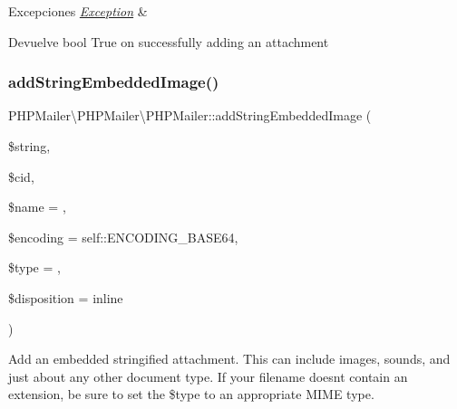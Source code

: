 \begin{DoxyExceptions}{Excepciones}
{\em \hyperlink{classPHPMailer_1_1PHPMailer_1_1Exception}{Exception}} & \\
\hline
\end{DoxyExceptions}
\begin{DoxyReturn}{Devuelve}
bool True on successfully adding an attachment 
\end{DoxyReturn}
\mbox{\label{classPHPMailer_1_1PHPMailer_1_1PHPMailer_aa329b7b65a55a32acdfceae30c1707a8}} 
\subsubsection{\texorpdfstring{add\+String\+Embedded\+Image()}{addStringEmbeddedImage()}}
{\footnotesize\ttfamily P\+H\+P\+Mailer\textbackslash{}\+P\+H\+P\+Mailer\textbackslash{}\+P\+H\+P\+Mailer\+::add\+String\+Embedded\+Image (\begin{DoxyParamCaption}\item[{}]{\$string,  }\item[{}]{\$cid,  }\item[{}]{\$name = {\ttfamily \textquotesingle{}\textquotesingle{}},  }\item[{}]{\$encoding = {\ttfamily self\+:\+:ENCODING\+\_\+BASE64},  }\item[{}]{\$type = {\ttfamily \textquotesingle{}\textquotesingle{}},  }\item[{}]{\$disposition = {\ttfamily \textquotesingle{}inline\textquotesingle{}} }\end{DoxyParamCaption})}

Add an embedded stringified attachment. This can include images, sounds, and just about any other document type. If your filename doesn\textquotesingle{}t contain an extension, be sure to set the \$type to an appropriate M\+I\+ME type.


